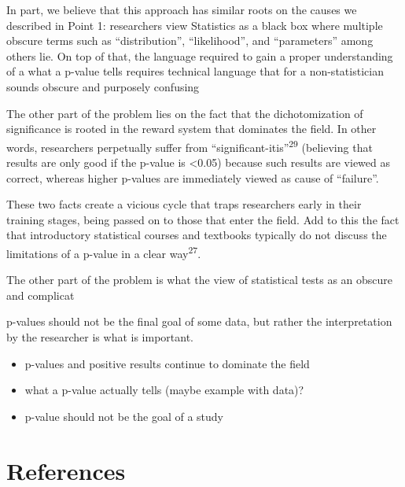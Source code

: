 \documentclass[smallextended]{svjour3}       %
\begin{document}
In part, we believe that this approach has similar roots on the causes
we described in Point 1: researchers view Statistics as a black box
where multiple obscure terms such as ``distribution'', ``likelihood'',
and ``parameters'' among others lie. On top of that, the language
required to gain a proper understanding of a what a p-value tells
requires technical language that for a non-statistician sounds obscure
and purposely confusing

The other part of the problem lies on the fact that the dichotomization
of significance is rooted in the reward system that dominates the field.
In other words, researchers perpetually suffer from
``significant-itis''\textsuperscript{29} (believing that results are
only good if the p-value is \textless0.05) because such results are
viewed as correct, whereas higher p-values are immediately viewed as
cause of ``failure''.

These two facts create a vicious cycle that traps researchers early in
their training stages, being passed on to those that enter the field.
Add to this the fact that introductory statistical courses and textbooks
typically do not discuss the limitations of a p-value in a clear
way\textsuperscript{27}.

The other part of the problem is what the view of statistical tests as
an obscure and complicat

p-values should not be the final goal of some data, but rather the
interpretation by the researcher is what is important.

\begin{itemize}
\item
  p-values and positive results continue to dominate the field
\item
  what a p-value actually tells (maybe example with data)?
\item
  p-value should not be the goal of a study
\end{itemize}

\hypertarget{references}{%
\section*{References}\label{references}}
\end{document}
